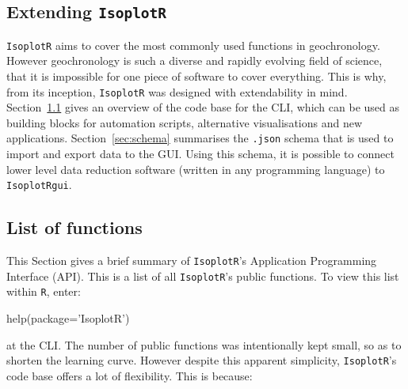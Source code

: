\begin{refsection}

\chapter{Extending \texttt{IsoplotR}}\label{ch:extending-IsoplotR}

\texttt{IsoplotR} aims to cover the most commonly used functions in
geochronology. However geochronology is such a diverse and rapidly
evolving field of science, that it is impossible for one piece of
software to cover everything. This is why, from its inception,
\texttt{IsoplotR} was designed with extendability in
mind. Section~\ref{sec:API} gives an overview of the code base for the
CLI, which can be used as building blocks for automation scripts,
alternative visualisations and new
applications. Section~\ref{sec:schema} summarises the \texttt{.json}
schema that is used to import and export data to the GUI. Using this
schema, it is possible to connect lower level data reduction software
(written in any programming language) to \texttt{IsoplotRgui}.

\section{List of functions}\label{sec:API}

This Section gives a brief summary of \texttt{IsoplotR}'s Application
Programming Interface (API). This is a list of all \texttt{IsoplotR}'s
public functions. To view this list within \texttt{R}, enter:

\begin{console}
help(package='IsoplotR')
\end{console}

\noindent at the CLI. The number of public functions was intentionally
kept small, so as to shorten the learning curve. However despite this
apparent simplicity, \texttt{IsoplotR}'s code base offers a lot of
flexibility. This is because:


\end{refsection}
